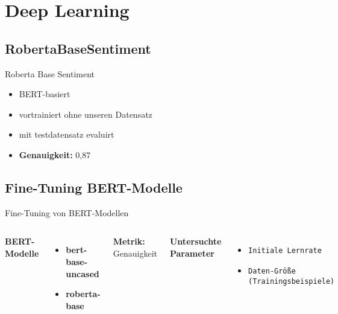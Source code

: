 \documentclass[aspectratio=169]{beamer} %
\begin{document}
\section{Deep Learning}

\subsection{RobertaBaseSentiment}
\begin{frame}{Roberta Base Sentiment}
\begin{itemize}
      \item BERT-basiert
      \item vortrainiert ohne unseren Datensatz
      \item mit testdatensatz evaluirt
      \vspace{0.5cm}
      \item \textbf{Genauigkeit:} 0,87
  \end{itemize}
\end{frame}

\subsection{Fine-Tuning BERT-Modelle}
\begin{frame}{Fine-Tuning von BERT-Modellen}
  \fontsize{10pt}{12pt}\selectfont
  \vspace{0.3cm}

  \begin{columns}
      \textbf{BERT-Modelle}
      \vspace{0.3cm}
      \begin{itemize}
          \item \textbf{bert-base-uncased}
          \item \textbf{roberta-base}
      \end{itemize}
      \vspace{0.5cm}
      \textbf{Metrik:} Genauigkeit
      \vspace{-1cm}

      \textbf{Untersuchte Parameter}
      \vspace{0.3cm}
      \begin{itemize}
          \item \texttt{Initiale Lernrate}
          \item \texttt{Daten-Größe (Trainingsbeispiele)}
      \end{itemize}
  \end{columns}
\end{frame}
\end{document}

